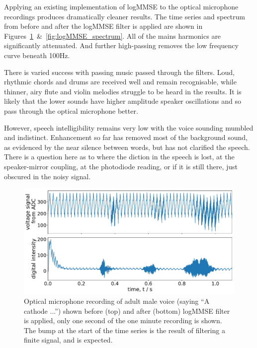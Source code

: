 \documentclass[prb,preprint]{revtex4-1}
\begin{document}
Applying an existing implementation of logMMSE\cite{logmmse} to the optical microphone recordings produces dramatically cleaner results. The time series and spectrum from before and after the logMMSE filter is applied are shown in Figures~\ref{fig:logMMSE_timeseries}~\&~\ref{fig:logMMSE_spectrum}. All of the mains harmonics are significantly attenuated. And further high-passing removes the low frequency curve beneath 100Hz.


There is varied success with passing music passed through the filters. Loud, rhythmic chords and drums are received well and remain recognisable, while thinner, airy flute and violin melodies struggle to be heard in the results. It is likely that the lower sounds have higher amplitude speaker oscillations and so pass through the optical microphone better.


However, speech intelligibility remains very low with the voice sounding mumbled and indistinct. Enhancement so far has removed most of the background sound, as evidenced by the near silence between words, but has not clarified the speech. There is a question here as to where the diction in the speech is lost, at the speaker-mirror coupling, at the photodiode reading, or if it is still there, just obscured in the noisy signal.


\begin{figure}%
	\includegraphics[width=\textwidth]{figures/filter_timeseries_aa_melatos-cropped.pdf}
	\caption{Optical microphone recording of adult male voice (saying ``A cathode ...'') shown before (top) and after (bottom) logMMSE filter is applied, only one second of the one minute recording is shown. The bump at the start of the time series is the result of filtering a finite signal, and is expected.}
	\label{fig:logMMSE_timeseries}
\end{figure}
\end{document}

